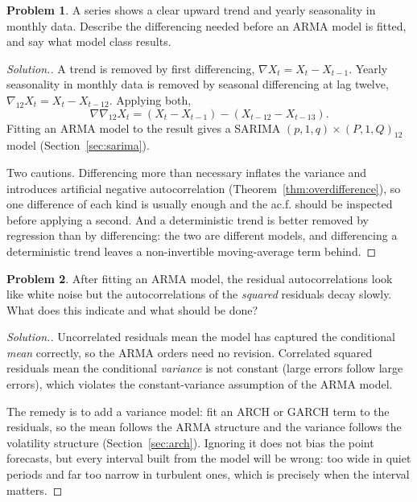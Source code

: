 \documentclass[11pt,a4paper]{article}
\theoremstyle{definition}
\newtheorem{problemx}{Problem}[subsection]
\newenvironment{problem}{\begin{problemx}}{\end{problemx}}
\newenvironment{solution}
  {\renewcommand{\qedsymbol}{}\begin{proof}[\textit{Solution}.]}
  {\end{proof}}
\begin{document}
\begin{problem}
A series shows a clear upward trend and yearly seasonality in monthly data. Describe the differencing needed
before an ARMA model is fitted, and say what model class results.
\end{problem}
\begin{solution}
A trend is removed by first differencing, $\nabla X_t = X_t - X_{t-1}$. Yearly seasonality in monthly data is removed by seasonal
differencing at lag twelve, $\nabla_{12}X_t = X_t - X_{t-12}$. Applying both,
\[
\nabla\nabla_{12}X_t = (X_t - X_{t-1}) - (X_{t-12} - X_{t-13}) .
\]
Fitting an ARMA model to the result gives a SARIMA $(p, 1, q) \times (P, 1, Q)_{12}$ model (Section~\ref{sec:sarima}).

Two cautions. Differencing more than necessary inflates the variance and introduces artificial negative
autocorrelation (Theorem~\ref{thm:overdifference}), so one difference of each kind is usually enough and the ac.f. should be
inspected before applying a second. And a deterministic trend is better removed by regression than by
differencing: the two are different models, and differencing a deterministic trend leaves a non-invertible
moving-average term behind.
\end{solution}

\begin{problem}
After fitting an ARMA model, the residual autocorrelations look like white noise but the autocorrelations of the
\emph{squared} residuals decay slowly. What does this indicate and what should be done?
\end{problem}
\begin{solution}
Uncorrelated residuals mean the model has captured the conditional \emph{mean} correctly, so the ARMA orders need
no revision. Correlated squared residuals mean the conditional \emph{variance} is not constant (large errors follow
large errors), which violates the constant-variance assumption of the ARMA model.

The remedy is to add a variance model: fit an ARCH or GARCH term to the residuals, so the mean follows the
ARMA structure and the variance follows the volatility structure (Section~\ref{sec:arch}). Ignoring it does not bias the point
forecasts, but every interval built from the model will be wrong: too wide in quiet periods and far too narrow
in turbulent ones, which is precisely when the interval matters.
\end{solution}
\end{document}
